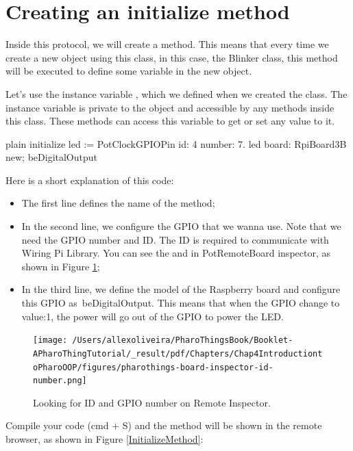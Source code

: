 \documentclass[10pt,twoside,english]{_support/latex/sbabook/sbabook}
\begin{document}
\section{Creating an initialize method}
Inside this protocol, we will create a  method. This means that every time we create a new object using this class, in this case, the Blinker class, this method will be executed to define some variable in the new object.

Let's use the instance variable , which we defined when we created the class. The instance variable is private to the object and accessible by any methods inside this class. These methods can access this variable to get or set any value to it.

\begin{displaycode}{plain}
initialize 
  led := PotClockGPIOPin id: 4 number: 7. 
  led board: RpiBoard3B new; beDigitalOutput
\end{displaycode}

Here is a short explanation of this code:

\begin{itemize}
\item The first line defines the name of the method;
\item In the second line, we configure the GPIO that we wanna use. Note that we need the GPIO number and ID. The ID is required to communicate with Wiring Pi Library. You can see the  and  in PotRemoteBoard inspector, as shown in Figure \ref{RemoteInspector};
\item In the third line, we define the model of the Raspberry board and configure this GPIO as beDigitalOutput. This means that when the GPIO change to value:1, the power will go out of the GPIO to power the LED.
\end{itemize}


\begin{figure}

\begin{center}
\texttt{[image: /Users/allexoliveira/PharoThingsBook/Booklet-APharoThingTutorial/\_result/pdf/Chapters/Chap4IntroductiontoPharoOOP/figures/pharothings-board-inspector-id-number.png]}\caption{Looking for ID and GPIO number on Remote Inspector.\label{RemoteInspector}}\end{center}
\end{figure}


Compile your code (cmd + S) and the method will be shown in the remote browser, as shown in Figure \ref{InitializeMethod}:
\end{document}
